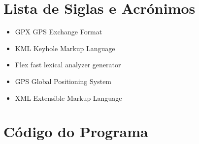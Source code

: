 \documentclass{llncs}
\begin{document}
\section{Lista de Siglas e Acrónimos}
\begin{itemize}
    \item GPX   GPS Exchange Format
    \item KML   Keyhole Markup Language
    \item Flex  fast lexical analyzer generator
    \item GPS   Global Positioning System
    \item XML   Extensible Markup Language
\end{itemize}

\appendix
\section{Código do Programa}
\end{document}
